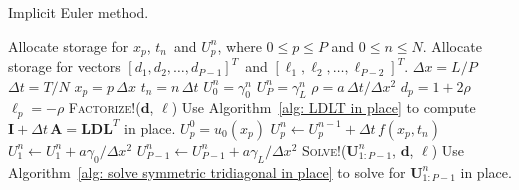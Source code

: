 \begin{algorithm}
\caption{Implicit Euler method.}
\label{alg: implicit Euler}
\begin{algorithmic}
\State Allocate storage for $x_p$, $t_n$~and $U^n_p$, where $0\le p\le P$ and 
$0\le n\le N$.
\State Allocate storage for vectors $[d_1,d_2,\ldots,d_{P-1}]^T$~and
$[\ell_1,\ell_2,\ldots,\ell_{P-2}]^T$.
\State $\Delta x=L/P$ 
\State$\Delta t=T/N$
    \State $x_p=p\,\Delta x$
\EndFor
{}
    \State $t_n=n\,\Delta t$
    \State $U^n_0=\gamma_0^n$
    \State $U^n_P=\gamma_L^n$
\EndFor
\State $\rho=a\,\Delta t/\Delta x^2$
    \State $d_p=1+2\rho$
\EndFor
{}
    \State $\ell_p=-\rho$
\EndFor
\State \textsc{Factorize!}($\boldsymbol{d}$, $\boldsymbol{\ell}$)
\Comment Use Algorithm~\ref{alg: LDLT in place} to compute
$\boldsymbol{I}+\Delta t\,\boldsymbol{A}=\boldsymbol{L}\boldsymbol{D}
\boldsymbol{L}^T$ in place.
    \State $U^0_p=u_0(x_p)$
\EndFor
{}
        \State $U^n_p\gets U^{n-1}_p+\Delta t\,f(x_p,t_n)$
    \EndFor
    \State $U^n_1\gets U^n_1+a\gamma_0/\Delta x^2$
    \State $U^n_{P-1}\gets U^n_{P-1}+a\gamma_L/\Delta x^2$
    \State \textsc{Solve}!($\boldsymbol{U}^n_{1:P-1}$,
$\boldsymbol{d}$, $\boldsymbol{\ell}$)
\Comment Use Algorithm~\ref{alg: solve symmetric tridiagonal in place} to solve
for $\boldsymbol{U}^n_{1:P-1}$ in place.
\EndFor
\end{algorithmic}
\end{algorithm}

